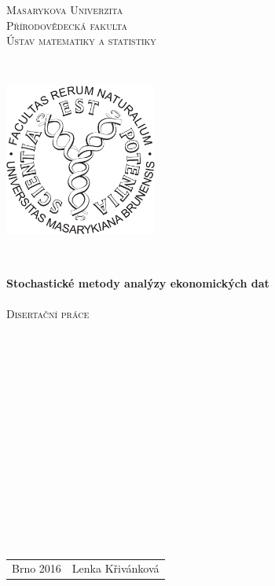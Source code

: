 \documentclass[a4paper,12pt]{report}
\theoremstyle{definition} \newtheorem{definice}[veta]{Definice}
\theoremstyle{remark}
\begin{document}
\titlepage
\begin{center}
\textsc{\Large{Masarykova Univerzita}} \\
\textsc{\Large{Přírodovědecká fakulta}} \\
\textsc{\large{Ústav matematiky a statistiky}}
\end{center}\quad \\
%
\begin{center}
\includegraphics[width=5cm]{IMG/sci-logo.pdf}
\end{center}\quad \\
%
\begin{center}
\textbf{\Large{Stochastické metody analýzy ekonomických dat}} \\ \quad \\
\textsc{\large{Disertační práce}}
\end{center} \quad \\\\\\\\\\\\\\\\\\\\\\\\\\ \\
\begin{center}
\large{
\begin{tabular}{l  r}
\Large{Brno 2016} \qquad\qquad\qquad\qquad \qquad\qquad & \Large{Lenka Křivánková}
\end{tabular}
}
\end{center} \quad
%
\end{document}
